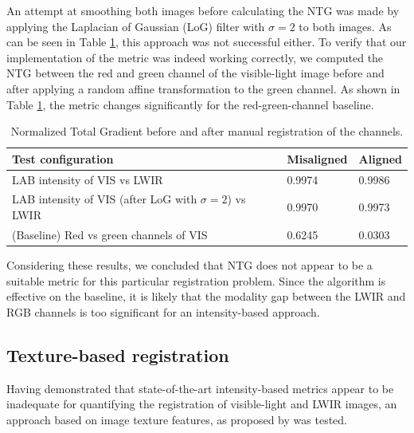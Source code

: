 \documentclass{l4proj}
\begin{document}
An attempt at smoothing both images before calculating the NTG was made by applying the Laplacian of Gaussian (LoG) filter with $\sigma=2$ to both images. As can be seen in Table \ref{table:registration_ntg}, this approach was not successful either. To verify that our implementation of the metric was indeed working correctly, we computed the NTG between the red and green channel of the visible-light image before and after applying a random affine transformation to the green channel. As shown in Table \ref{table:registration_ntg}, the metric changes significantly for the red-green-channel baseline. 

\begin{table}[ht]
  \centering
  \begin{tabular}{@{}lll@{}}
    \toprule
    \textbf{Test configuration}                               & \textbf{Misaligned} & \textbf{Aligned} \\ \midrule
    LAB intensity of VIS vs LWIR                              & 0.9974              & 0.9986           \\
    LAB intensity of VIS (after LoG with $\sigma=2$) vs LWIR  & 0.9970              & 0.9973           \\
    (Baseline) Red vs green channels of VIS                   & 0.6245              & 0.0303           \\ \bottomrule
  \end{tabular}
  \vspace*{3mm}
  \caption{Normalized Total Gradient before and after manual registration of the channels.}
  \label{table:registration_ntg}
  \vspace*{-3mm}
\end{table}

Considering these results, we concluded that NTG does not appear to be a suitable metric for this particular registration problem. Since the algorithm is effective on the baseline, it is likely that the modality gap between the LWIR and RGB channels is too significant for an intensity-based approach.

\subsection{Texture-based registration}

Having demonstrated that state-of-the-art intensity-based metrics appear to be inadequate for quantifying the registration of visible-light and LWIR images, an approach based on image texture features, as proposed by \citet{jarc_graz_2007} was tested. 
\end{document}
